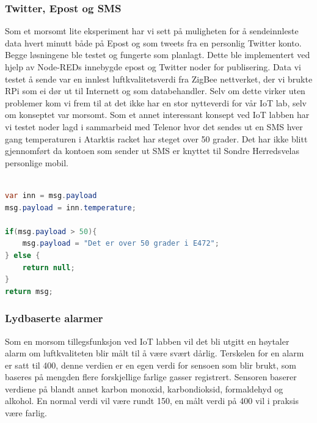 \documentclass{article}
\begin{document}
\subsubsection{Twitter, Epost og SMS}
Som et morsomt lite eksperiment har vi sett på muligheten for å sendeinnleste data hvert minutt både på Epost og som tweets fra en personlig Twitter konto. Begge løsningene ble testet og fungerte som planlagt. Dette ble implementert ved hjelp av Node-REDs innebygde epost og Twitter noder for publisering. Data vi testet å sende var en innlest luftkvalitetsverdi fra ZigBee nettverket, der vi brukte RPi som ei dør ut til Internett og som databehandler. Selv om dette virker uten problemer kom vi frem til at det ikke har en stor nytteverdi for vår IoT lab, selv om konseptet var morsomt. Som et annet interessant konsept ved IoT labben har vi testet noder lagd i sammarbeid med Telenor hvor det sendes ut en SMS hver gang temperaturen i Atarktis racket har steget over 50 grader. Det har ikke blitt gjennomført da kontoen som sender ut SMS er knyttet til Sondre Herredsvelas personlige mobil.

\begin{lstlisting}[language=Java, caption=Funksjons node for temperatur alarm via Epost]

var inn = msg.payload
msg.payload = inn.temperature;

if(msg.payload > 50){
    msg.payload = "Det er over 50 grader i E472";
} else {
    return null;
}
return msg;
\end{lstlisting}

\subsubsection{Lydbaserte alarmer}
Som en morsom tillegsfunksjon ved IoT labben vil det bli utgitt en høytaler alarm om luftkvaliteten blir målt til å være svært dårlig. Terskelen for en alarm er satt til 400, denne verdien er en egen verdi for sensoen som blir brukt, som baseres på mengden flere forskjellige farlige gasser registrert. Sensoren baserer verdiene på blandt annet karbon monoxid, karbondioksid, formaldehyd og alkohol. En normal verdi vil være rundt 150, en målt verdi på 400 vil i praksis være farlig.
\end{document}
